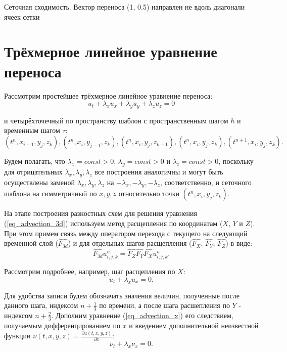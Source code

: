 \documentclass[11pt]{article}
\begin{document}
\begin{table}
\caption {Сеточная сходимость. Вектор переноса (1, 0.5) направлен не вдоль диагонали ячеек сетки} \label{tab_convergence_nondiagonal_2d}
\bigskip

\end{table}

\fi

\section{Трёхмерное линейное уравнение переноса}

Рассмотрим простейшее трёхмерное линейное уравнение переноса:
\begin{equation}
\label{eq_advection_3d}
u_t + \lambda_x u_x + \lambda_y u_y + \lambda_z u_z = 0
\end{equation}

и четырёхточечный по пространству шаблон с пространственным шагом $h$ и временным шагом $\tau$:
\begin{equation}
\label{eq_stencil_4}
(t^n, x_{i - 1}, y_j, z_k), (t^n, x_i, y_{j - 1}, z_k), (t^n, x_i, y_j, z_{k - 1}), (t^n, x_i, y_j, z_k), (t^{n + 1}, x_i, y_j, z_k).
\end{equation}

Будем полагать, что $\lambda_x = const > 0$, $\lambda_y = const > 0$ и $\lambda_z = const > 0$, поскольку для отрицательных $\lambda_x, \lambda_y, \lambda_z$ все построения аналогичны и могут быть осуществлены заменой $\lambda_x, \lambda_y, \lambda_z$ на $-\lambda_x, -\lambda_y, -\lambda_z$, соответственно, и сеточного шаблона на симметричный по $x, y, z$ относительно точки $(t^n, x_i, y_j, z_k)$.

На этапе построения разностных схем для решения уравнения (\ref{eq_advection_3d}) используем метод расщепления по координатам ($X$, $Y$ и $Z$).
При этом примем связь между оператором перехода с текущего на следующий временной слой ($\hat{F_{3d}}$)
 и для отдельных шагов расщепления ($\hat{F_X}$, $\hat{F_Y}$, $\hat{F_Z}$) в виде:
\begin{equation}
\label{eq_operators}
\hat{F_{3d}} u^n_{i,j,k} = \hat{F_Z} \hat{F_Y} \hat{F_X} u^n_{i,j,k}.
\end{equation}

Рассмотрим подробнее, например, шаг расщепления по $X$:
\begin{equation}
\label{eq_advection_x}
u_t + \lambda_x u_x = 0.
\end{equation}

Для удобства записи будем обозначать значения величин, полученные после данного шага, индексом $n + \frac{1}{3}$ по времени, а после шага расшепления по $Y$ - индексом $n + \frac{2}{3}$.
Дополним уравнение (\ref{eq_advection_x}) его следствием, получаемым дифференцированием по $x$ и введением дополнительной неизвестной функции $\nu(t, x, y, z) = \frac{\partial u(t, x, y, z)}{\partial x}$:
\begin{equation}
\label{eq_advection_x_ext}
\nu_t + \lambda_x \nu_x = 0.
\end{equation}
\end{document}
